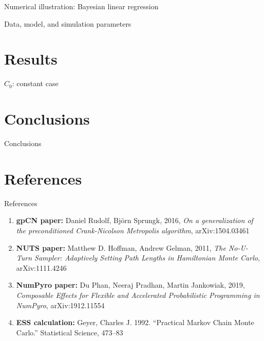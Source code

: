 \documentclass[aspectratio=169,xcolor=dvipsnames]{beamer}
\begin{document}
\begin{frame}{Numerical illustration: Bayesian linear regression}
 
\end{frame}

\begin{frame}{Data, model, and simulation parameters}


\end{frame}

\section{Results}

\begin{frame}{$C_0$: constant case}

\end{frame}

\section{Conclusions}

\begin{frame}{Conclusions}

\end{frame}

\section{References}

\begin{frame}{References}
\begin{enumerate}
    \item \textbf{gpCN paper:} Daniel Rudolf, Björn Sprungk, 2016, \textit{On a generalization of the preconditioned Crank-Nicolson Metropolis algorithm}, arXiv:1504.03461
    \item \textbf{NUTS paper:} Matthew D. Hoffman, Andrew Gelman, 2011, \textit{The No-U-Turn Sampler: Adaptively Setting Path Lengths in Hamiltonian Monte Carlo}, arXiv:1111.4246
    \item \textbf{NumPyro paper:} Du Phan, Neeraj Pradhan, Martin Jankowiak, 2019, \textit{Composable Effects for Flexible and Accelerated Probabilistic Programming in NumPyro}, arXiv:1912.11554
    \item \textbf{ESS calculation:} Geyer, Charles J. 1992. “Practical Markov Chain Monte Carlo.” Statistical Science, 473–83
\end{enumerate}

\end{frame}

\end{document}
